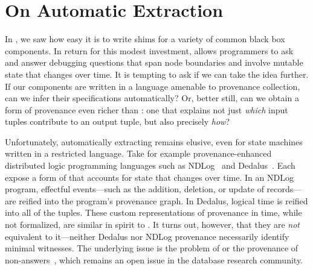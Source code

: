 \section{On Automatic \WatProvenance{} Extraction}
In , we saw how easy it is to write shims for a variety of
common black box components. In return for this modest investment, \fluent{}
allows programmers to ask and answer debugging questions that span node
boundaries and involve mutable state that changes over time. It is tempting to
ask if we can take the idea further. If our components are written in a
language amenable to provenance collection, can we infer their \watprovenance{}
specifications automatically? Or, better still, can we obtain a form of
provenance even richer than \watprovenance{}: one that explains not just
\emph{which} input tuples contribute to an output tuple, but also precisely
\emph{how}?

Unfortunately, automatically extracting \watprovenance{} remains elusive, even
for state machines written in a restricted language. Take for example
provenance-enhanced distributed logic programming languages such as
NDLog~\cite{loo2006design} and Dedalus~\cite{alvaro2011dedalus}. Each expose a
form of \whyprovenance{} that accounts for state that changes over time. In an
NDLog program, effectful events---such as the addition, deletion, or update of
records---are reified into the program's provenance graph. In Dedalus, logical
time is reified into all of the tuples. These custom representations of
provenance in time, while not formalized, are similar in spirit to
\watprovenance{}. It turns out, however, that they are \emph{not} equivalent to
it---neither Dedalus nor NDLog provenance necessarily identify minimal
witnesses. The underlying issue is the problem of 
or the provenance of non-answers~\cite{chapman2009whynot,huang2008nonanswers},
which remains an open issue in the database research community.

\newcommand{\kvset}{\text{set}}
\newcommand{\kvget}{\text{get}}
\newcommand{\freeze}{\text{freeze}}
\newcommand{\trunc}{\text{trunc}}


